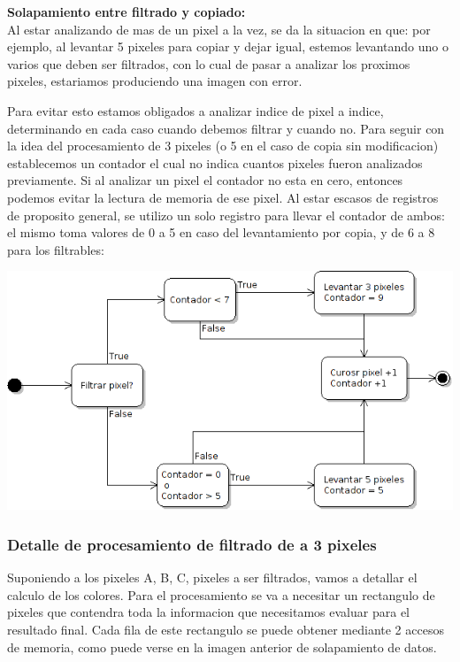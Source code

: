\textbf{Solapamiento entre filtrado y copiado:}
\\
Al estar analizando de mas de un pixel a la vez, se da la situacion en que: por ejemplo, al levantar 5 pixeles para copiar y dejar igual, estemos levantando uno o varios que deben ser filtrados, con lo cual de pasar a analizar los proximos pixeles, estariamos produciendo una imagen con error. 

Para evitar esto estamos obligados a analizar indice de pixel a indice, determinando en cada caso cuando debemos filtrar y cuando no. Para seguir con la idea del procesamiento de 3 pixeles (o 5 en el caso de copia sin modificacion) establecemos un contador el cual no indica cuantos pixeles fueron analizados previamente. Si al analizar un pixel el contador no esta en cero, entonces podemos evitar la lectura de memoria de ese pixel. Al estar escasos de registros de proposito general, se utilizo un solo registro para llevar el contador de ambos: el mismo toma valores de 0 a 5 en caso del levantamiento por copia, y de 6 a 8 para los filtrables: 

\includegraphics[scale=0.5]{imagenes/uml-mini.png}



\subsubsection{Detalle de procesamiento de filtrado de a 3 pixeles}

Suponiendo a los pixeles A, B, C, pixeles a ser filtrados, vamos a detallar el calculo de los colores. Para el procesamiento se va a necesitar un rectangulo de pixeles que contendra toda la informacion que necesitamos evaluar para el resultado final. Cada fila de este rectangulo se puede obtener mediante 2 accesos de memoria, como puede verse en la imagen anterior de solapamiento de datos.\\

